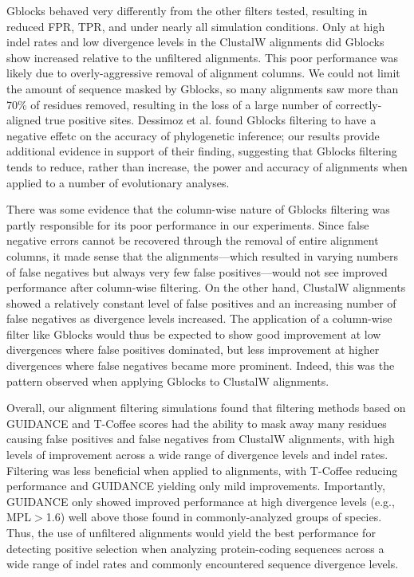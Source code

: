 \documentclass{mbe}
\begin{document}
Gblocks behaved very differently from the other filters tested,
resulting in reduced FPR, TPR, and \tpr under nearly all simulation
conditions. Only at high indel rates and low divergence levels in the
ClustalW alignments did Gblocks show increased \tpr relative to the
unfiltered alignments. This poor performance was likely due to
overly-aggressive removal of alignment columns. We could not limit the
amount of sequence masked by Gblocks, so many alignments saw more than
70\% of residues removed, resulting in the loss of a large number of
correctly-aligned true positive sites. Dessimoz et
al. \citeyearpar{Dessimoz2010Phylogenetic} found Gblocks filtering to
have a negative effetc on the accuracy of phylogenetic inference; our
results provide additional evidence in support of their finding,
suggesting that Gblocks filtering tends to reduce, rather than
increase, the power and accuracy of alignments when applied to a
number of evolutionary analyses.

There was some evidence that the column-wise nature of Gblocks
filtering was partly responsible for its poor performance in our
experiments. Since false negative errors cannot be recovered through
the removal of entire alignment columns, it made sense that the
\prankc alignments---which resulted in varying numbers of false
negatives but always very few false positives---would not see improved
performance after column-wise filtering. On the other hand, ClustalW
alignments showed a relatively constant level of false positives and
an increasing number of false negatives as divergence levels
increased. The application of a column-wise filter like Gblocks would
thus be expected to show good improvement at low divergences where
false positives dominated, but less improvement at higher divergences
where false negatives became more prominent. Indeed, this was the
pattern observed when applying Gblocks to ClustalW alignments.

Overall, our alignment filtering simulations found that filtering
methods based on GUIDANCE and T-Coffee scores had the ability to mask
away many residues causing false positives and false negatives from
ClustalW alignments, with high levels of improvement across a wide
range of divergence levels and indel rates. Filtering was less
beneficial when applied to \prankc alignments, with T-Coffee reducing
performance and GUIDANCE yielding only mild \tpr
improvements. Importantly, GUIDANCE only showed improved performance
at high divergence levels (e.g., MPL$>$1.6) well above those found in
commonly-analyzed groups of species. Thus, the use of unfiltered
\prankc alignments would yield the best performance for detecting \sw
positive selection when analyzing protein-coding sequences across a
wide range of indel rates and commonly encountered sequence divergence
levels.
\end{document}
